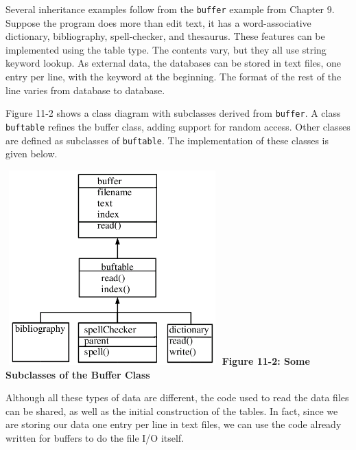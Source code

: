 Several inheritance examples follow from the \texttt{buffer}
example from Chapter 9. Suppose the program does more than
edit text, it has a word-associative
dictionary, bibliography, spell-checker, and thesaurus. These
features can be implemented using the table type.
The contents vary, but they all use string
keyword lookup. As external data, the databases can be stored in text
files, one entry per line, with the keyword at the beginning. The
format of the rest of the line varies from database to database.

Figure 11-2 shows a class diagram with subclasses derived from
\texttt{buffer}. A class \texttt{buftable} refines the
buffer class, adding support for random access. Other classes are
defined as subclasses of \texttt{buftable}. The implementation of these
classes is given below.


\begin{center}
\includegraphics[width=3.24in,height=2.95in]{ub-img/ub-img43.png}
\linebreak
{\sffamily\bfseries Figure 11-2: Some Subclasses of the Buffer Class}
\end{center}

\bigskip

Although all these types of data are different, the code used to read
the data files can be shared, as well as the initial construction of
the tables. In fact, since we are storing our data one entry per line
in text files, we can use the code already written for buffers to do
the file I/O itself. 



